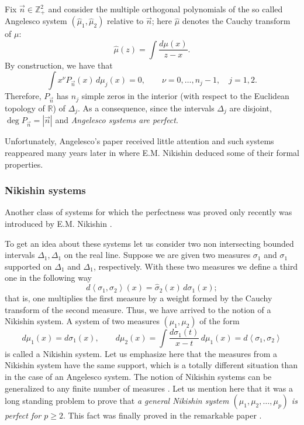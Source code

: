 \documentclass{amsart}
\theoremstyle{remark}
\numberwithin{equation}{section}
\begin{document}
Fix $\vec{n} \in {{\mathbb Z}}_+^{2}$ and consider the multiple orthogonal polynomials of the so called Angelesco system $(\widehat{\mu}_1,\widehat{\mu}_2)$ relative to $\vec{n}$; here  $\widehat{\mu}$ denotes the Cauchy transform of $\mu$:
\[
\widehat{\mu}(z) = \int \frac{d\mu(x)}{z-x}.
\]
By construction, we have that
\[ \int x^{\nu} P_{\vec{n}}(x) \, d\mu_j(x) =0, \qquad \nu = 0,\ldots,n_j -1,\quad j=1,2.
\]
Therefore, $P_{\vec{n}}$ has $n_j$ simple zeros in the interior (with respect to the Euclidean topology of ${{\mathbb R}}$) of $\Delta_j$. As a consequence, since the intervals $\Delta_j$ are disjoint, ${\operatorname{deg}} P_{\vec{n}} = |\vec{n}|$ and
\textit{Angelesco systems are perfect}.

Unfortunately, Angelesco's paper received little attention and such systems  reappeared many years later in \cite{Nik1} where E.M. Nikishin  deduced some of their formal properties.

\subsubsection{Nikishin systems}

Another class of systems for which the perfectness was proved only recently was introduced by E.M. Nikishin  \cite{Nik}.

To get an idea about these systems let us consider two non intersecting bounded intervals $\Delta_{1}, \Delta_{1}$ on the real line. Suppose we are given two measures $\sigma_{1}$ and $\sigma_{1}$ supported
on $\Delta_{1}$ and $\Delta_{1}$, respectively. With these two measures we define a third one in the following way
\[ d\left<\sigma_{1},\sigma_{2}\right>(x) = \widehat{\sigma}_{2}(x)\, d\sigma_{1}(x);
\]
that is, one multiplies the first measure by a weight formed by the Cauchy transform of the second measure. Thus, we have arrived to the notion of a Nikishin system. A system of two measures $(\mu_1, \mu_2)$ of the form
\[
d\mu_1(x)=d\sigma_{1}(x), \qquad d\mu_2(x)=\int \frac{d\sigma_1(t)}{x-t}\, d\mu_1(x)
=d\left<\sigma_{1},\sigma_{2}\right>
\]
is called a Nikishin system.
Let us emphasize here that the measures from a Nikishin system have the same support,
which is a totally different situation than in the case of an Angelesco system.
The notion of Nikishin systems can be generalized to any finite number of measures \cite{AptLopRo}.
Let us mention here that it was a long standing problem to prove that \textit{a general Nikishin system
$(\mu_1, \mu_2, \dots, \mu_p)$ is perfect for $p\ge 2$}. This fact was finally proved
in the remarkable paper \cite{FL}.
\end{document}
